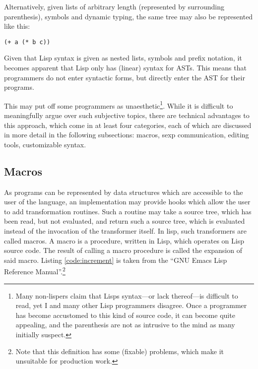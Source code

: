 \documentclass[a4paper,10pt,twoside]{article}
\begin{document}
Alternatively, given lists of arbitrary length (represented by surrounding
parenthesis), symbols and dynamic typing, the same tree may also be represented
like this:


\begin{lstlisting}[style=lispinline]
  (+ a (* b c))
\end{lstlisting}

Given that Lisp syntax is given as nested lists, symbols and prefix notation, it
becomes apparent that Lisp only has (linear) syntax for ASTs.  This means that
programmers do not enter syntactic forms, but directly enter the AST for their
programs.

This may put off some programmers as unaesthetic\footnote{Many non-lispers claim
  that Lisps syntax---or lack thereof---is difficult to read, yet I and many
  other Lisp programmers disagree.  Once a programmer has become accustomed to
  this kind of source code, it can become quite appealing, and the parenthesis
  are not as intrusive to the mind as many initially suspect.}.  While it is
difficult to meaningfully argue over such subjective topics, there are technical
advantages to this approach, which come in at least four categories, each of
which are discussed in more detail in the following subsections: macros, sexp
communication, editing tools, customizable syntax.

\subsection{Macros}
\label{subsec:macros}

As programs can be represented by data structures which are accessible to the
user of the language, an implementation may provide hooks which allow the user
to add transformation routines.  Such a routine may take a source tree, which
has been read, but not evaluated, and return such a source tree, which is
evaluated instead of the invocation of the transformer itself.  In lisp, such
transformers are called macros.  A macro is a procedure, written in Lisp, which
operates on Lisp source code.  The result of calling a macro procedure is called
the expansion of said macro.  Listing \ref{code:increment} is taken from the
``GNU Emacs Lisp Reference Manual''.\footnote{Note that this definition has some
  (fixable) problems, which make it unsuitable for production work.}
\end{document}
